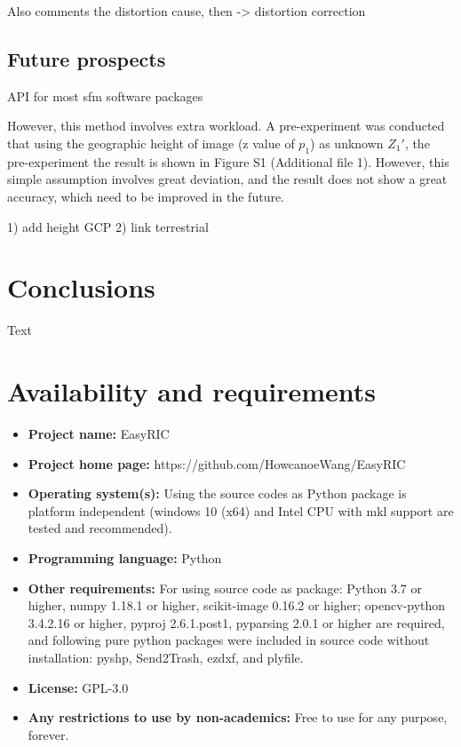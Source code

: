 \documentclass{configs/bmcart}
\begin{document}
Also comments the distortion cause, then -> distortion correction 

\subsection*{Future prospects}
API for most \acrshort*{sfm} software packages

However, this method involves extra workload. A pre-experiment was conducted that using the geographic height of image (z value of $p_1$) as unknown $Z_1'$, the pre-experiment the result is shown in Figure S1 (Additional file 1). However, this simple assumption involves great deviation, and the result does not show a great accuracy, which need to be improved in the future.

 1) add height GCP 2) link terrestrial


\section*{Conclusions}
Text

\section*{Availability and requirements}
\begin{itemize}
  \item \textbf{Project name:} EasyRIC
  \item \textbf{Project home page:} https://github.com/HowcanoeWang/EasyRIC
  \item \textbf{Operating system(s):} Using the source codes as Python package is platform independent (windows 10 (x64) and Intel CPU with \acrfull*{mkl} support are tested and recommended).
  \item \textbf{Programming language: } Python
  \item \textbf{Other requirements:} For using source code as package: Python 3.7 or higher, numpy 1.18.1 or higher, scikit-image 0.16.2 or higher; opencv-python 3.4.2.16 or higher, pyproj 2.6.1.post1, pyparsing 2.0.1 or higher are required, and following pure python packages were included in source code without installation: pyshp, Send2Trash, ezdxf, and plyfile.
  \item \textbf{License:} GPL-3.0
  \item \textbf{Any restrictions to use by non-academics:} Free to use for any purpose, forever.
\end{itemize}
\end{document}
